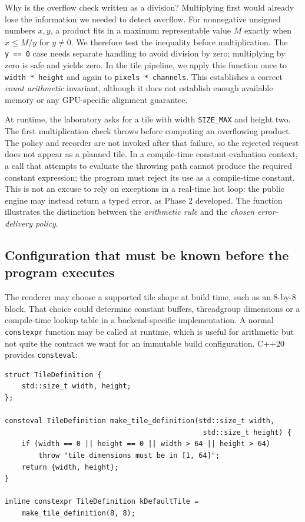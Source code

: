 Why is the overflow check written as a division? Multiplying first would already lose the information we needed to detect overflow. For nonnegative unsigned numbers \(x,y\), a product fits in a maximum representable value \(M\) exactly when \(x\le M/y\) for \(y\ne0\). We therefore test the inequality before multiplication. The \texttt{y\ ==\ 0} case needs separate handling to avoid division by zero; multiplying by zero is safe and yields zero. In the tile pipeline, we apply this function once to \texttt{width\ *\ height} and again to \texttt{pixels\ *\ channels}. This establishes a correct \emph{count arithmetic} invariant, although it does not establish enough available memory or any GPU-specific alignment guarantee.

At runtime, the laboratory asks for a tile with width \texttt{SIZE\_MAX} and height two. The first multiplication check throws before computing an overflowing product. The policy and recorder are not invoked after that failure, so the rejected request does not appear as a planned tile. In a compile-time constant-evaluation context, a call that attempts to evaluate the throwing path cannot produce the required constant expression; the program must reject its use as a compile-time constant. This is not an excuse to rely on exceptions in a real-time hot loop: the public engine may instead return a typed error, as Phase 2 developed. The function illustrates the distinction between the \emph{arithmetic rule} and the \emph{chosen error-delivery policy}.

\subsection{Configuration that must be known before the program executes}\label{05-engine-i-ch005-configuration-that-must-be-known-before-the-program-executes}

The renderer may choose a supported tile shape at build time, such as an 8-by-8 block. That choice could determine constant buffers, threadgroup dimensions or a compile-time lookup table in a backend-specific implementation. A normal \texttt{constexpr} function may be called at runtime, which is useful for arithmetic but not quite the contract we want for an immutable build configuration. C++20 provides \texttt{consteval}:

\begin{verbatim}
struct TileDefinition {
    std::size_t width, height;
};

consteval TileDefinition make_tile_definition(std::size_t width,
                                               std::size_t height) {
    if (width == 0 || height == 0 || width > 64 || height > 64)
        throw "tile dimensions must be in [1, 64]";
    return {width, height};
}

inline constexpr TileDefinition kDefaultTile =
    make_tile_definition(8, 8);
\end{verbatim}

